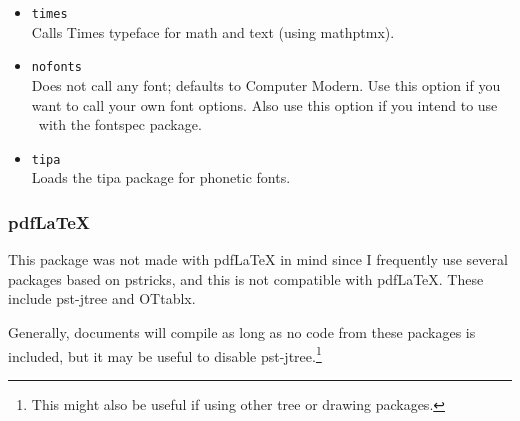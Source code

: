 \documentclass[11pt, tipa, color]{./lingdoc}
\newcommand{\Option}[1]{\texttt{#1}}
\newcommand{\Package}[1]{\textsf{{#1}}}
\newcommand{\ipa}{\Abbrev{ipa}\xspace}
\begin{document}
      \begin{itemize}[leftmargin=0em]
        \item \Option{times} \\ 
	  Calls Times typeface for math and text (using \Package{mathptmx}).
	  
        \item \Option{nofonts} \\ 
	  Does not call any font; defaults to Computer Modern. Use this option if you want to call your own font options. Also use this option if you intend to use \XeLaTeX\ with the \Package{fontspec} package.
	  
	\item \Option{tipa} \\
	  Loads the \Package{tipa} package for \ipa phonetic fonts.
      \end{itemize}
      
      
% 
%   
%         
% 

  \subsubsection[pdfLaTeX]{pdf\LaTeX{}}
  
    This package was not made with pdf\LaTeX{} in mind since I frequently use several packages based on \Package{pstricks}, and this is not compatible with pdf\LaTeX{}. These include \Package{pst-jtree} and \Package{OTtablx}. 

    Generally, documents will compile as long as no code from these packages is included, but it may be useful to disable \Package{pst-jtree}.\footnote{This might also be useful if using other tree or drawing packages.}
    
\end{document}
